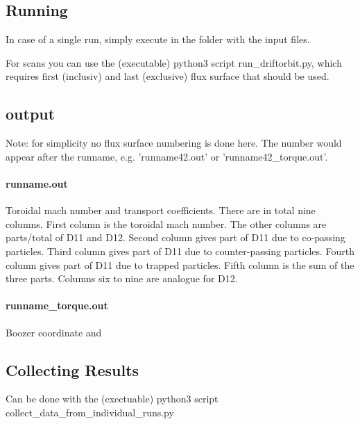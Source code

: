 \subsection{Running}
In case of a single run, simply execute \neort in the folder with the
input files.

For scans you can use the (executable) python3 script
run\_driftorbit.py, which requires first (inclusiv) and last (exclusive)
flux surface that should be used.

\subsection{output}
Note: for simplicity no flux surface numbering is done here. The number
would appear after the runname, e.g. 'runname42.out' or 'runname42_torque.out'.

\paragraph{runname.out}
Toroidal mach number and transport coefficients.
There are in total nine columns. First column is the toroidal mach
number. The other columns are parts/total of D11 and D12. Second column
gives part of D11 due to co-passing particles. Third column gives part
of D11 due to counter-passing particles. Fourth column gives part of D11
due to trapped particles. Fifth column is the sum of the three parts.
Columns six to nine are analogue for D12.

\paragraph{runname\_torque.out}
Boozer coordinate and

\subsection{Collecting Results}
Can be done with the (exectuable) python3 script
collect\_data\_from\_individual\_runs.py
